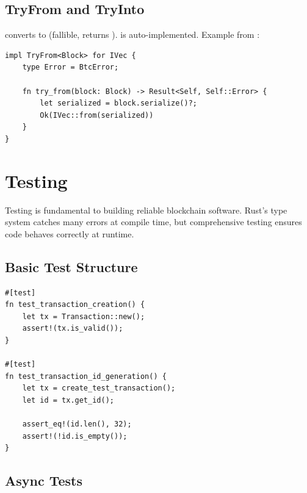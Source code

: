 \subsection{TryFrom and TryInto}
\label{subsec:ch24-tryfrom-tryinto}

 converts  to  (fallible, returns ).  is auto-implemented. Example from :

\begin{listing}[htbp]
\caption{TryFrom for fallible conversion}
\label{lst:ch24-tryfrom}
\begin{verbatim}
impl TryFrom<Block> for IVec {
    type Error = BtcError;

    fn try_from(block: Block) -> Result<Self, Self::Error> {
        let serialized = block.serialize()?;
        Ok(IVec::from(serialized))
    }
}
\end{verbatim}
\end{listing}

\section{Testing}
\label{sec:ch24-testing}

Testing is fundamental to building reliable blockchain software. Rust's type system catches many errors at compile time, but comprehensive testing ensures code behaves correctly at runtime.

\subsection{Basic Test Structure}
\label{subsec:ch24-test-basic}

\begin{listing}[H]
\caption{Simple unit test}
\label{lst:ch24-test-basic}
\begin{verbatim}
#[test]
fn test_transaction_creation() {
    let tx = Transaction::new();
    assert!(tx.is_valid());
}

#[test]
fn test_transaction_id_generation() {
    let tx = create_test_transaction();
    let id = tx.get_id();

    assert_eq!(id.len(), 32);
    assert!(!id.is_empty());
}
\end{verbatim}
\end{listing}

\subsection{Async Tests}
\label{subsec:ch24-test-async}

